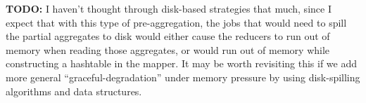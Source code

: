 \documentclass[12pt]{article}
\begin{document}
\textbf{TODO:} I haven't thought through disk-based strategies that much,
since I expect that with this type of pre-aggregation, the jobs that would
need to spill the partial aggregates to disk would either cause the reducers
to run out of memory when reading those aggregates, or would run out of memory
while constructing a hashtable in the mapper.  It may be worth revisiting this
    if we add more general ``graceful-degradation'' under memory pressure by
        using disk-spilling algorithms and data structures.






\end{document}
